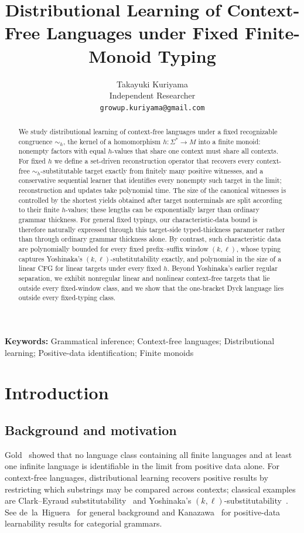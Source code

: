 \documentclass[11pt,a4paper]{article}
\title{Distributional Learning of Context-Free Languages under Fixed Finite-Monoid Typing}
\author{Takayuki Kuriyama\\
Independent Researcher\\
\texttt{growup.kuriyama@gmail.com}}
\date{}
\theoremstyle{remark}
\theoremstyle{plain}
\begin{document}
\linenumbers
\maketitle

\begin{abstract}
We study distributional learning of context-free languages under a fixed
recognizable congruence $\sim_h$, the kernel of a homomorphism
$h:\Sigma^*\to M$ into a finite monoid: nonempty factors with equal $h$-values
that share one context must share all contexts.  For fixed $h$ we define a
set-driven reconstruction operator that recovers every context-free
$\sim_h$-substitutable target exactly from finitely many positive witnesses,
and a conservative sequential learner that identifies every nonempty such
target in the limit; reconstruction and updates take polynomial time.  The
size of the canonical witnesses is controlled by the shortest yields obtained
after target nonterminals are split according to their finite $h$-values; these
lengths can be exponentially larger than ordinary grammar thickness.  For
general fixed typings, our characteristic-data bound is therefore naturally
expressed through this target-side typed-thickness parameter rather than through
ordinary grammar thickness alone.  By contrast, such characteristic data
are polynomially bounded for every fixed
prefix--suffix window $(k,\ell)$, whose typing captures Yoshinaka's
$(k,\ell)$-substitutability exactly, and polynomial in the size of a linear
CFG for linear targets under every fixed $h$.  Beyond Yoshinaka's earlier regular separation, we exhibit nonregular linear
and nonlinear context-free targets that lie outside every fixed-window class,
and we show that the one-bracket Dyck language lies outside every fixed-typing
class.
\end{abstract}

\noindent\textbf{Keywords:} Grammatical inference; Context-free languages;
Distributional learning; Positive-data identification; Finite monoids
\par\medskip

\section{Introduction}

\subsection{Background and motivation}

Gold~\cite{gold1967} showed that no language class containing all finite
languages and at least one infinite language is identifiable in the limit
from positive data alone.  For context-free languages, distributional
learning recovers positive results by restricting which substrings may be
compared across contexts; classical examples are Clark--Eyraud
substitutability~\cite{clark-eyraud2007} and Yoshinaka's
$(k,\ell)$-substitutability~\cite{yoshinaka2008}.  See
de~la~Higuera~\cite{higuera2010} for general background and
Kanazawa~\cite{kanazawa1993} for positive-data learnability results
for categorial grammars.
\end{document}
